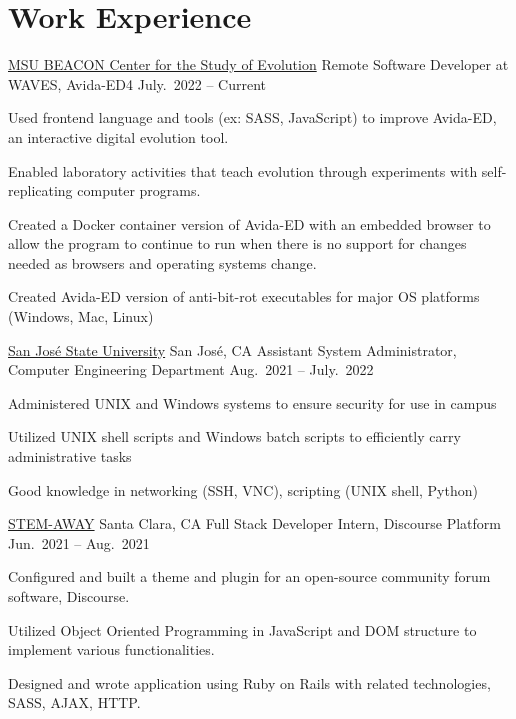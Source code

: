 \documentclass[10pt]{article}
\begin{document}
\spacedhrule{0.8ex}{0.0ex}

\vspace{-1ex}\section{Work Experience}\vspace{-0.5ex}\nopagebreak[4]

\headedsection
{\href{https://avida-ed.msu.edu/app4/}{MSU BEACON Center for the Study of Evolution}}
{Remote}
{Software Developer at WAVES, Avida-ED4}
{{July.\ 2022 – Current}}{
\vspace{-2.4ex}
\begin{circlist}
	\item Used frontend language and tools (ex: SASS, JavaScript) to improve Avida-ED, an interactive digital evolution tool.
	\item Enabled laboratory activities that teach evolution through experiments with self-replicating computer programs.
	\item Created a Docker container version of Avida-ED with an embedded browser to allow the program to continue to run when there is no support for changes needed as browsers and operating systems change.
	\item Created Avida-ED version of anti-bit-rot executables for major OS platforms (Windows, Mac, Linux)

\end{circlist}
}

\headedsection
{\href{https://cmpe.sjsu.edu/faculty-staff}{San José State University}}
{San José, CA}
{Assistant System Administrator, Computer Engineering Department}
{{Aug.\ 2021 – July.\ 2022}}{
\vspace{-2.4ex}
\begin{circlist}
	\item Administered UNIX and Windows systems to ensure security for use in campus
	\item Utilized UNIX shell scripts and Windows batch scripts to efficiently carry administrative tasks
	\item Good knowledge in networking (SSH, VNC), scripting (UNIX shell, Python)
\end{circlist}
}

\headedsection
{\href{https://meta.discourse.org/}{STEM-AWAY}}
{Santa Clara, CA}
{Full Stack Developer Intern, Discourse Platform}
{{Jun.\ 2021 – Aug.\ 2021}}{
\vspace{-2.4ex}
\begin{circlist}
	\item Configured and built a theme and plugin for an open-source community forum software, Discourse.
	\item Utilized Object Oriented Programming in JavaScript and DOM structure to implement various functionalities.
	\item Designed and wrote application using Ruby on Rails with related technologies, SASS, AJAX, HTTP.
\end{circlist}
}
\end{document}
